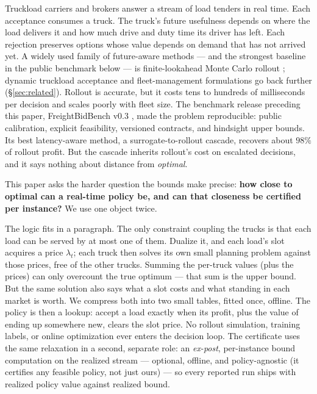 \documentclass[11pt]{article}
\begin{document}
Truckload carriers and brokers answer a stream of load tenders in real
time. Each acceptance consumes a truck. The truck's future usefulness
depends on where the load delivers it and how much drive and duty time
its driver has left. Each rejection preserves options whose value
depends on demand that has not arrived yet. A widely used family of
future-aware methods --- and the strongest baseline in the public
benchmark below --- is finite-lookahead Monte Carlo rollout
\citep{bertsekas1997rollout,goodson2017rollout}; dynamic truckload
acceptance and fleet-management formulations go back further
(\S\ref{sec:related}). Rollout is
accurate, but it costs tens to hundreds of milliseconds per decision
and scales poorly with fleet size. The benchmark release preceding this
paper, FreightBidBench v0.3 \citep{chandrasekaran2026freightbidbench},
made the problem reproducible: public calibration, explicit
feasibility, versioned contracts, and hindsight upper bounds. Its best
latency-aware method, a surrogate-to-rollout cascade, recovers about
$98\%$ of rollout profit. But the cascade inherits rollout's cost on
escalated decisions, and it says nothing about distance from
\emph{optimal}.

This paper asks the harder question the bounds make precise:
\textbf{how close to optimal can a real-time policy be, and can that
closeness be certified per instance?} We use one object twice.

The logic fits in a paragraph. The only constraint coupling the trucks
is that each load can be served by at most one of them. Dualize it,
and each load's slot acquires a price $\lambda_t$; each truck then
solves its own small planning problem against those prices, free of
the other trucks. Summing the per-truck values (plus the prices) can
only overcount the true optimum --- that sum is the upper bound. But
the same solution also says what a slot costs and what standing in
each market is worth. We compress both into two small tables, fitted
once, offline. The policy is then a lookup: accept a load exactly when
its profit, plus the value of ending up somewhere new, clears the
slot price. No rollout simulation, training labels, or online
optimization ever enters the decision loop. The certificate uses the
same relaxation in a second, separate role: an \emph{ex-post},
per-instance bound computation on the realized stream --- optional,
offline, and policy-agnostic (it certifies any feasible policy, not
just ours) --- so every reported run ships with realized policy value
against realized bound.
\end{document}
